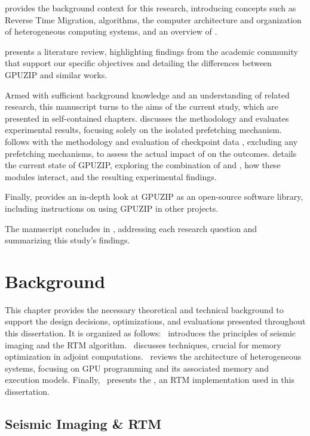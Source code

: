 \documentclass[Ingles]{ic-tese-v3}
\begin{document}
 provides the background context for this research, introducing concepts such as Reverse Time Migration, \checkpointing algorithms, the computer architecture and organization of heterogeneous computing systems, and an overview of \awave.

 presents a literature review, highlighting findings from the academic community that support our specific objectives and detailing the differences between GPUZIP and similar works.

Armed with sufficient background knowledge and an understanding of related research, this manuscript turns to the aims of the current study, which are presented in self-contained chapters.  discusses the \checkpointprefetching methodology and evaluates experimental results, focusing solely on the isolated prefetching mechanism.  follows with the methodology and evaluation of checkpoint data \compression, excluding any prefetching mechanisms, to assess the actual impact of \compression on the outcomes.  details the current state of GPUZIP, exploring the combination of \prefetching and \compression, how these modules interact, and the resulting experimental findings.

Finally,  provides an in-depth look at GPUZIP as an open-source software library, including instructions on using GPUZIP in other projects.

The manuscript concludes in , addressing each research question and summarizing this study's findings.

\chapter {Background}
\label{ch:background}

This chapter provides the necessary theoretical and technical background to support the design decisions, optimizations, and evaluations presented throughout this dissertation. It is organized as follows:~ introduces the principles of seismic imaging and the RTM algorithm.~ discusses \checkpointing techniques, crucial for memory optimization in adjoint computations.~ reviews the architecture of heterogeneous systems, focusing on GPU programming and its associated memory and execution models. Finally,~ presents the \awave, an RTM implementation used in this dissertation.


\section{Seismic Imaging \& RTM}
\label{sec:rtm}
\end{document}
